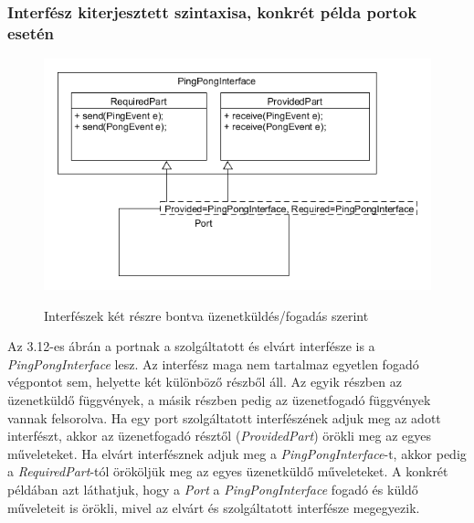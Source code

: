 \documentclass[a4paper,12pt]{report}
\begin{document}
\subsubsection{Interfész kiterjesztett szintaxisa, konkrét példa portok esetén}
\begin{figure}[H]
\begin{center}
\includegraphics[scale=0.7]{seperate_inf.png} \\
\end{center}
\caption{Interfészek két részre bontva üzenetküldés/fogadás szerint}
\end{figure}

Az 3.12-es ábrán a portnak a szolgáltatott és elvárt interfésze is a \textit{PingPongInterface} lesz. Az interfész maga nem tartalmaz egyetlen fogadó végpontot sem, helyette két különböző részből áll. Az egyik részben az üzenetküldő függvények, a másik részben pedig az üzenetfogadó függvények vannak felsorolva. Ha egy port szolgáltatott interfészének adjuk meg az adott interfészt, akkor az üzenetfogadó résztől (\textit{ProvidedPart}) örökli meg az egyes műveleteket. Ha elvárt interfésznek adjuk meg a \textit{PingPongInterface}-t, akkor pedig a \textit{RequiredPart}-tól örököljük meg az egyes üzenetküldő műveleteket. A konkrét példában azt láthatjuk, hogy a \textit{Port} a \textit{PingPongInterface} fogadó és küldő műveleteit is örökli, mivel az elvárt és szolgáltatott interfésze megegyezik.
\end{document}
